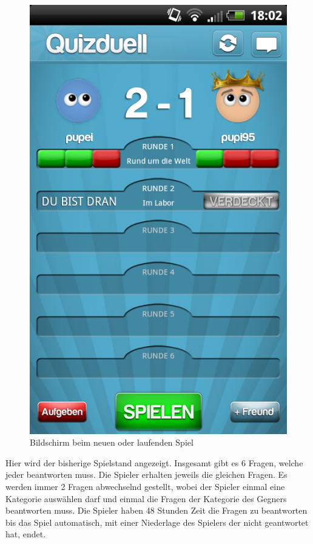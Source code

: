 \documentclass[fontsize=12pt,paper=a4,twoside]{scrartcl}
\begin{document}
\begin{figure}[H]
\centering
\includegraphics[scale=0.5]{Bilder/spiel.png}
\caption{Bildschirm beim neuen oder laufenden Spiel}
\end{figure}

Hier wird der bisherige Spielstand angezeigt. Insgesamt gibt es 6 Fragen, welche jeder beantworten muss. Die Spieler erhalten jeweils die gleichen Fragen. Es werden immer 2 Fragen abwechselnd gestellt, wobei der Spieler einmal eine Kategorie auswählen darf und einmal die Fragen der Kategorie des Gegners beantworten muss. Die Spieler haben 48 Stunden Zeit die Fragen zu beantworten bis das Spiel automatisch, mit einer Niederlage des Spielers der nicht geantwortet hat, endet. 
\end{document}
